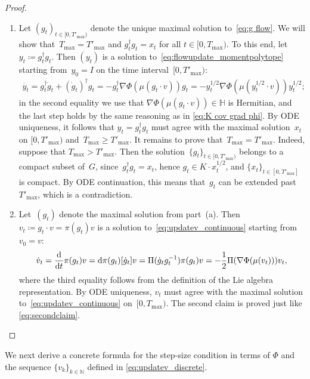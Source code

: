 \documentclass[11pt,letterpaper]{article}
\numberwithin{equation}{section}
\newcommand{\NN}{\mathbb{N}}
\newcommand{\bbH}{\mathbb{H}}
\newcommand{\diff}{\mathrm{d}}
\begin{document}
\begin{proof}
\begin{enumerate}
\item[(a)]
Let $(g_t)_{t \in [0,T'_{\max})}$ denote the unique maximal solution to~\eqref{eq:g flow}.
We will show that~$T_{\max} = T'_{\max}$ and $g_t^\dagger g_t = x_t$ for all $t \in [0,T_{\max})$.
To this end, let $y_t \coloneqq g_t^\dagger g_t$.
Then $(y_t)$ is a solution to~\eqref{eq:flowupdate_momentpolytope} starting from~$y_0 = I$ on the time interval~$[0,T'_{\max})$:
\begin{align*}
    \dot{y_t}
= g_t^\dagger \dot g_t + (\dot g_t)^\dagger g_t
= - g_t^\dagger \nabla\Phi(\mu(g_t\cdot v)) g_t
= - y_t^{1/2} \nabla\Phi(\mu(y_t^{1/2}\cdot v)) y_t^{1/2};
\end{align*}
in the second equality we use that $\nabla\Phi(\mu(g_t\cdot v)) \in \bbH$ is Hermitian, and the last step holds by the same reasoning as in \cref{eq:K cov grad phi}.
By ODE uniqueness, it follows that $y_t = g_t^\dagger g_t$ must agree with the maximal solution~$x_t$ on $[0,T'_{\max})$ and~$T_{\max} \geq T'_{\max}$.
It remains to prove that~$T_{\max} = T'_{\max}$.
Indeed, suppose that $T_{\max} > T'_{\max}$.
Then the solution~$\{g_t\}_{t \in [0,T'_{\max})}$ belongs to a compact subset of~$G$, since~$g_t^\dagger g_t = x_t$, hence $g_t \in K \cdot x_t^{1/2}$, and $\{x_t\}_{t \in [0,T'_{\max}]}$ is compact.
By ODE continuation, this means that~$g_t$ can be extended past $T'_{\max}$, which is a contradiction.

\item[(b)]
Let~$(g_t)$ denote the maximal solution from part~(a).
Then~$v_t \coloneqq g_t \cdot v = \pi(g_t) v$ is a solution to~\eqref{eq:updatev_continuous} starting from~$v_0 = v$:
\begin{align*}
    \dot v_t
=   \frac{\diff}{\diff t} \pi(g_t) v
=   \diff\pi(g_t)[\dot g_t] v
=   \Pi(\dot g_t g_t^{-1}) \pi(g_t) v
=   -\frac12\Pi\mleft(\nabla\Phi(\mu(v_t))\mright) v_t,
\end{align*}
where the third equality follows from the definition of the Lie algebra representation.
By ODE uniqueness, $v_t$ must agree with the maximal solution to~\eqref{eq:updatev_continuous} on~$[0,T_{\max})$.
The second claim is proved just like \cref{eq:secondclaim}.
\end{enumerate}
\end{proof}

We next derive a concrete formula for the step-size condition in terms of $\Phi$ and the sequence $\{v_k\}_{k \in \NN}$ defined in \cref{eq:updatev_discrete}.
\end{document}

